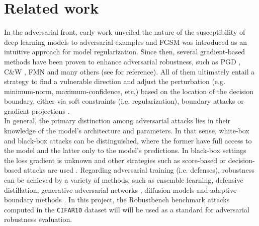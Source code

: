 
\section{Related work}

In the adversarial front, early work 
\cite{szegedyIntriguingPropertiesNeural2014}
unveiled the nature of the susceptibility of deep learning 
models to adversarial examples and FGSM 
\cite{goodfellowExplainingHarnessingAdversarial2015}
was introduced as an intuitive
approach for model regularization. 
Since then, several gradient-based methods have been
proven to enhance adversarial robustness, such as PGD
\cite{madryDeepLearningModels2019}, C\&W 
\cite{carliniEvaluatingRobustnessNeural2017},
FMN
\cite{pintorFastMinimumnormAdversarial2021} and
many others (see 
\cite{liReviewAdversarialAttack2022} for reference). 
All of them ultimately entail a strategy to find
a vulnerable direction and adjust the perturbation 
(e.g. minimum-norm, maximum-confidence, etc.)
based on the location of the decision boundary, either via soft
constraints (i.e. regularization), boundary attacks or gradient
projections
\cite{baiRecentAdvancesAdversarial2021}. \\

In general, the primary distinction among adversarial attacks lies in
their knowledge of the model's architecture and parameters. In that
sense, white-box and black-box
attacks can be distinguished, where the former have full 
access to the model and the latter only 
to the model's predictions. In black-box settings the loss gradient
is unknown and other strategies such as score-based or
decision-based attacks are used
\cite{liReviewAdversarialAttack2022}. Regarding adversarial training (i.e. defenses), 
robustness can
be achieved by a variety of methods, 
such as ensemble learning,
defensive distillation,
generative adversarial networks
\cite{xiaoGeneratingAdversarialExamples2019, miyatoVirtualAdversarialTraining2018},
diffusion models
\cite{wangBetterDiffusionModels2023,hoDenoisingDiffusionProbabilistic2020}
and adaptive-boundary methods
\cite{cohenCertifiedAdversarialRobustness2019}.
In this project, the Robustbench benchmark attacks 
\cite{croceRobustBenchStandardizedAdversarial2021a}
computed in the \texttt{CIFAR10} dataset will will
be used as a standard for adversarial robustness evaluation. \\

